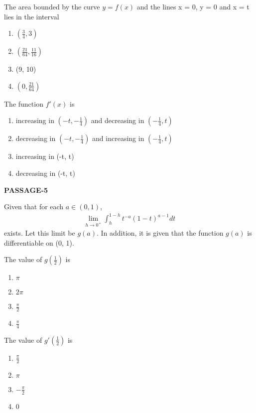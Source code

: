 \item The area bounded by the curve $y = f(x)$ and the lines x = 0, y = 0 and x = t lies in the interval
\begin{enumerate}
\item $\left(\frac{3}{4}, 3\right)$
\item $\left(\frac{21}{64}, \frac{11}{16}\right)$
\item (9, 10)
\item $\left(0, \frac{21}{64}\right)$
\end{enumerate}

\item The function $f'(x)$ is
\begin{enumerate}
\item increasing in $\left(-t, -\frac{1}{4}\right)$ and decreasing in $\left(-\frac{1}{4}, t\right)$
\item decreasing in $\left(-t, -\frac{1}{4}\right)$ and increasing in $\left(-\frac{1}{4}, t\right)$
\item increasing in (-t, t)
\item decreasing in (-t, t)
\end{enumerate}

\textbf{PASSAGE-5}

Given that for each $a \in (0, 1)$,
\begin{align*}
\lim_{h \to 0^{+}}\int_{h}^{1 - h}t^{-a}(1 - t)^{a - 1}dt
\end{align*}
exists. Let this limit be $g(a)$. In addition, it is given that the function $g(a)$ is differentiable on (0, 1).

\item The value of $g\left(\frac{1}{2}\right)$ is
\begin{enumerate}
\item $\pi$
\item $2\pi$
\item $\frac{\pi}{2}$
\item $\frac{\pi}{4}$
\end{enumerate}

\item The value of $g'\left(\frac{1}{2}\right)$ is
\begin{enumerate}
\item $\frac{\pi}{2}$
\item $\pi$
\item $-\frac{\pi}{2}$
\item 0
\end{enumerate}

